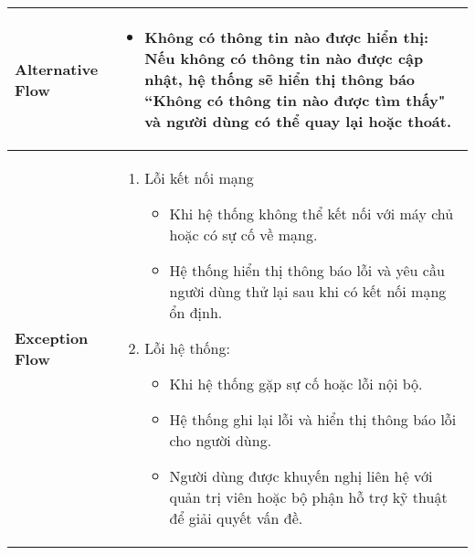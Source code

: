 \begin{longtable}[H]{|l|p{}|}
        \hline
        
        \textbf{Alternative Flow} & \vspace{-0.75cm}  \begin{itemize}[leftmargin=4mm]
            \setlength\itemsep{0em}
            \item Không có thông tin nào được hiển thị: Nếu không có thông tin nào được cập nhật, hệ thống sẽ hiển thị thông báo ``Không có thông tin nào được tìm thấy" và người dùng có thể quay lại hoặc thoát.
        \end{itemize} \\
        
        \hline
        
        \textbf{Exception Flow} & \vspace{-0.75cm}  \begin{enumerate}[leftmargin=5.5mm]
            \setlength\itemsep{0em}
            \item Lỗi kết nối mạng
                \begin{itemize}
                    \setlength\itemsep{0em}
                    \item Khi hệ thống không thể kết nối với máy chủ hoặc có sự cố về mạng.
                    \item Hệ thống hiển thị thông báo lỗi và yêu cầu người dùng thử lại sau khi có kết nối mạng ổn định.
                \end{itemize}
            \item Lỗi hệ thống:
                \begin{itemize}
                    \setlength\itemsep{0em}
                    \item Khi hệ thống gặp sự cố hoặc lỗi nội bộ.
                    \item Hệ thống ghi lại lỗi và hiển thị thông báo lỗi cho người dùng.
                    \item Người dùng được khuyến nghị liên hệ với quản trị viên hoặc bộ phận hỗ trợ kỹ thuật để giải quyết vấn đề.
                \end{itemize}
        \end{enumerate}\\
        \hline
    \end{longtable}

